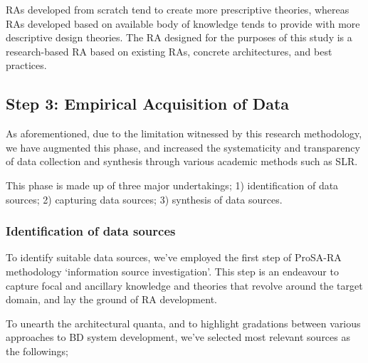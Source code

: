 \documentclass{bmcart}
\begin{document}
RAs developed from scratch tend to create more prescriptive theories, whereas RAs developed based on available body of knowledge tends to provide with more descriptive design theories. The RA designed for the purposes of this study is a research-based RA based on existing RAs, concrete architectures, and best practices.

\subsection{Step 3: Empirical Acquisition of Data }

As aforementioned, due to the limitation witnessed by this research methodology, we have augmented this phase, and increased the systematicity and transparency of data collection and synthesis through various academic methods such as SLR.

This phase is made up of three major undertakings; 1) identification of data sources; 2) capturing data sources; 3) synthesis of data sources.

\subsubsection{Identification of data sources}

To identify suitable data sources, we've employed the first step of ProSA-RA methodology `information source investigation'. This step is an endeavour to capture focal and ancillary knowledge and theories that revolve around the target domain, and lay the ground of RA development.

To unearth the architectural quanta, and to highlight gradations between various approaches to BD system development, we've selected most relevant sources as the followings;
\end{document}
